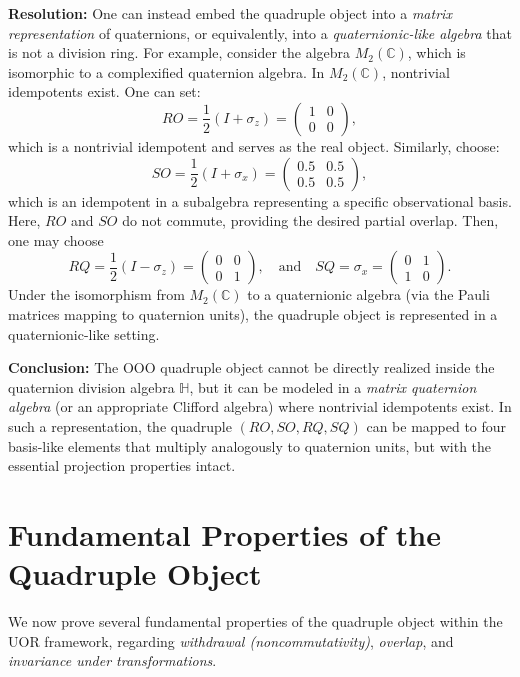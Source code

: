 \documentclass[12pt]{article}
\begin{document}
\textbf{Resolution:} One can instead embed the quadruple object into a \emph{matrix representation} of quaternions, or equivalently, into a \emph{quaternionic-like algebra} that is not a division ring. For example, consider the algebra $M_2(\mathbb{C})$, which is isomorphic to a complexified quaternion algebra. In $M_2(\mathbb{C})$, nontrivial idempotents exist. One can set:
\[
RO = \frac{1}{2}(I + \sigma_z) = \begin{pmatrix}1&0\\0&0\end{pmatrix},
\]
which is a nontrivial idempotent and serves as the real object. Similarly, choose:
\[
SO = \frac{1}{2}(I + \sigma_x) = \begin{pmatrix}0.5&0.5\\0.5&0.5\end{pmatrix},
\]
which is an idempotent in a subalgebra representing a specific observational basis. Here, $RO$ and $SO$ do not commute, providing the desired partial overlap. Then, one may choose
\[
RQ = \frac{1}{2}(I - \sigma_z) = \begin{pmatrix}0&0\\0&1\end{pmatrix}, \quad \text{and} \quad SQ = \sigma_x = \begin{pmatrix}0&1\\1&0\end{pmatrix}.
\]
Under the isomorphism from $M_2(\mathbb{C})$ to a quaternionic algebra (via the Pauli matrices mapping to quaternion units), the quadruple object is represented in a quaternionic-like setting. 

\medskip

\textbf{Conclusion:} The OOO quadruple object cannot be directly realized inside the quaternion division algebra $\mathbb{H}$, but it can be modeled in a \emph{matrix quaternion algebra} (or an appropriate Clifford algebra) where nontrivial idempotents exist. In such a representation, the quadruple $(RO, SO, RQ, SQ)$ can be mapped to four basis-like elements that multiply analogously to quaternion units, but with the essential projection properties intact.

\section{Fundamental Properties of the Quadruple Object}

We now prove several fundamental properties of the quadruple object within the UOR framework, regarding \emph{withdrawal (noncommutativity)}, \emph{overlap}, and \emph{invariance under transformations}.
\end{document}
